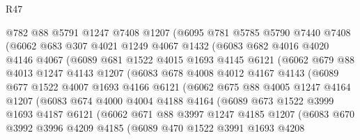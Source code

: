 \begin{lexlean}{R47}
\begin{coremodule}
          @782
          @88
          @5791
          @1247
          @7408
          @1207
          (@6095
            @781
            @5785
            @5790
            @7440
            @7408
            (@6062
              @683
              @307
              @4021
              @1249
              @4067
              @1432
              (@6083
                @682
                @4016
                @4020
                @4146
                @4067
                (@6089
                  @681
                  @1522
                  @4015
                  @1693
                  @4145
                  @6121
                  (@6062
                    @679
                    @88
                    @4013
                    @1247
                    @4143
                    @1207
                    (@6083
                      @678
                      @4008
                      @4012
                      @4167
                      @4143
                      (@6089
                        @677
                        @1522
                        @4007
                        @1693
                        @4166
                        @6121
                        (@6062
                          @675
                          @88
                          @4005
                          @1247
                          @4164
                          @1207
                          (@6083
                            @674
                            @4000
                            @4004
                            @4188
                            @4164
                            (@6089
                              @673
                              @1522
                              @3999
                              @1693
                              @4187
                              @6121
                              (@6062
                                @671
                                @88
                                @3997
                                @1247
                                @4185
                                @1207
                                (@6083
                                  @670
                                  @3992
                                  @3996
                                  @4209
                                  @4185
                                  (@6089
                                    @470
                                    @1522
                                    @3991
                                    @1693
                                    @4208

\end{coremodule}
\end{lexlean}
